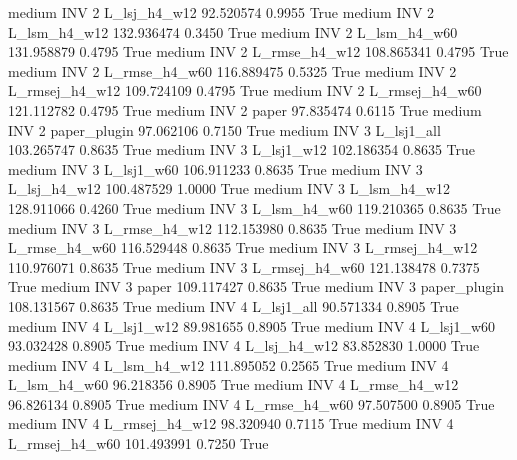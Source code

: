     medium      INV                 2   L_lsj_h4_w12  92.520574      0.9955    True
    medium      INV                 2   L_lsm_h4_w12 132.936474      0.3450    True
    medium      INV                 2   L_lsm_h4_w60 131.958879      0.4795    True
    medium      INV                 2  L_rmse_h4_w12 108.865341      0.4795    True
    medium      INV                 2  L_rmse_h4_w60 116.889475      0.5325    True
    medium      INV                 2 L_rmsej_h4_w12 109.724109      0.4795    True
    medium      INV                 2 L_rmsej_h4_w60 121.112782      0.4795    True
    medium      INV                 2          paper  97.835474      0.6115    True
    medium      INV                 2   paper_plugin  97.062106      0.7150    True
    medium      INV                 3     L_lsj1_all 103.265747      0.8635    True
    medium      INV                 3     L_lsj1_w12 102.186354      0.8635    True
    medium      INV                 3     L_lsj1_w60 106.911233      0.8635    True
    medium      INV                 3   L_lsj_h4_w12 100.487529      1.0000    True
    medium      INV                 3   L_lsm_h4_w12 128.911066      0.4260    True
    medium      INV                 3   L_lsm_h4_w60 119.210365      0.8635    True
    medium      INV                 3  L_rmse_h4_w12 112.153980      0.8635    True
    medium      INV                 3  L_rmse_h4_w60 116.529448      0.8635    True
    medium      INV                 3 L_rmsej_h4_w12 110.976071      0.8635    True
    medium      INV                 3 L_rmsej_h4_w60 121.138478      0.7375    True
    medium      INV                 3          paper 109.117427      0.8635    True
    medium      INV                 3   paper_plugin 108.131567      0.8635    True
    medium      INV                 4     L_lsj1_all  90.571334      0.8905    True
    medium      INV                 4     L_lsj1_w12  89.981655      0.8905    True
    medium      INV                 4     L_lsj1_w60  93.032428      0.8905    True
    medium      INV                 4   L_lsj_h4_w12  83.852830      1.0000    True
    medium      INV                 4   L_lsm_h4_w12 111.895052      0.2565    True
    medium      INV                 4   L_lsm_h4_w60  96.218356      0.8905    True
    medium      INV                 4  L_rmse_h4_w12  96.826134      0.8905    True
    medium      INV                 4  L_rmse_h4_w60  97.507500      0.8905    True
    medium      INV                 4 L_rmsej_h4_w12  98.320940      0.7115    True
    medium      INV                 4 L_rmsej_h4_w60 101.493991      0.7250    True
